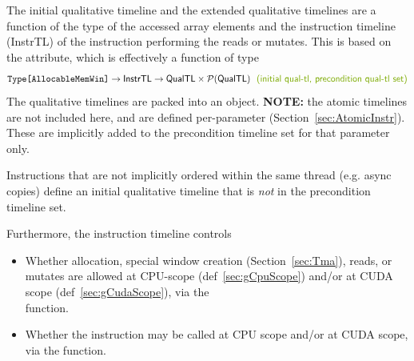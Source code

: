 The initial qualitative timeline and the extended qualitative timelines are a function of the  type of the accessed array elements and the instruction timeline (\textsf{InstrTL}) of the instruction performing the reads or mutates.
This is based on the  attribute, which is effectively a function of type
\begin{equation*}
    \texttt{Type[AllocableMemWin]} \to \mathsf{InstrTL} \to \mathsf{QualTL} \times \mathcal{P}(\mathsf{QualTL})\codecomment{~~(initial qual-tl, precondition qual-tl set)}
\end{equation*}
The qualitative timelines are packed into an  object.
\textbf{NOTE:} the atomic timelines are not included here, and are defined per-parameter (Section~\ref{sec:AtomicInstr}).
These are implicitly added to the precondition timeline set for that parameter only.

Instructions that are not implicitly ordered within the same thread (e.g. async copies) define an initial qualitative timeline that is \emph{not} in the precondition timeline set.

Furthermore, the instruction timeline controls
\begin{itemize}
  \item Whether allocation, special window creation (Section~\ref{sec:Tma}), reads, or mutates are allowed at CPU-scope (def~\ref{sec:gCpuScope}) and/or at CUDA scope (def~\ref{sec:gCudaScope}), via the\\
   function.
  \item Whether the instruction may be called at CPU scope and/or at CUDA scope, via the  function.
\end{itemize}

